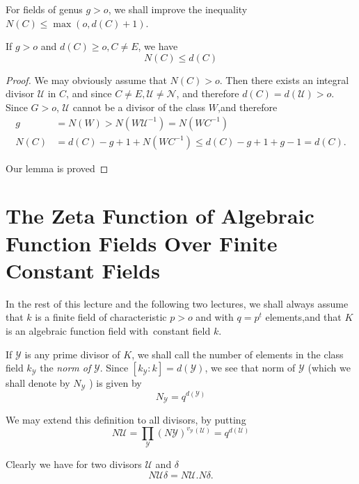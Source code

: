 For fields of genus $g > o$, we shall improve the inequality $N(C) \le
\max (o , d (C) + 1)$. 
\begin{lemma*}
  If $g > o$ and $d (C) \ge o, C \neq E$, we have
  $$
  N (C) \le d (C)
  $$
\end{lemma*}

\begin{proof}
  We may obviously assume that $N(C) > o$. Then there exists an
  integral divisor $\mathscr{U}$ in $C$, and since $C \neq E,
  \mathscr{U} \neq \mathscr{N}$, and therefore $d (C) = d
  (\mathscr{U}) >o$. Since $G > o$, $\mathscr{U}$ cannot be a divisor of
  the class $W$,and therefore 
  \begin{align*}
    g & = N (W) > N (W \mathscr{U}^{-1}) = N (WC^{-1})\\
    N (C) & = d(C) - g+1 + N (WC^{-1}) \le  d(C) - g+1 + g-1 =d (C).
  \end{align*}
  
  Our lemma is proved
\end{proof}

\section[The Zeta Function  of Algebraic...]{The Zeta Function  of Algebraic Function Fields Over Finite
  Constant Fields}\label{chap10:sec21}%


In the rest of this lecture and the following two lectures, we shall
always assume that $k$ is a finite field of characteristic $p > o$ and with
$q=p^t$ elements,and that $K$ is an algebraic function field with\pageoriginale\
constant field $k$. 

If $\mathscr{Y}$ is any prime divisor of $K$, we shall call the number
of elements in the class field $k_\mathscr{Y}$ the \textit{norm of }
$\mathscr{Y}$. Since $[k_\mathscr{Y} : k] = d (\mathscr{Y})$, we see
that norm of $\mathscr{Y}$ (which we shall denote by $N_\mathscr{Y}$ )
is given by 
$$
N_\mathscr{Y} = q^{d (\mathscr{Y})}
$$

We may extend this definition to all divisors, by putting
$$
N \mathscr{U} = \prod_{\mathscr{Y}} (N
\mathscr{Y})^{v{_{\mathscr{Y}}}}{^{(\mathscr{U})}} = q^{d
  (\mathscr{U})} 
$$

Clearly we have for two divisors $\mathscr{U}$ and $\delta$
$$
N \mathscr{U} \delta = N \mathscr{U} . N \delta.
$$

